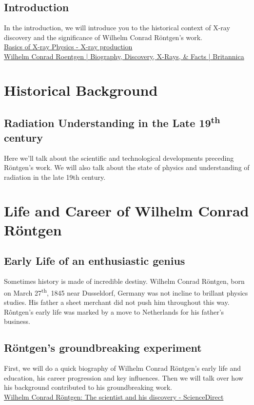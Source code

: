\documentclass[a4paper,12pt]{report}
\begin{document}
\newpage
\section*{Introduction}
In the introduction,  we will introduce you to the historical context of X-ray discovery and the significance of Wilhelm Conrad Röntgen's work. \\

\href{https://radiologymasterclass.co.uk}{Basics of X-ray Physics - X-ray production}\\ 

\href{https://www.britannica.com/biography/Wilhelm-Rontgen}{Wilhelm Conrad Roentgen | Biography, Discovery, X-Rays, \& Facts | Britannica }

\chapter{Historical Background}
\section{Radiation Understanding in the Late 19\textsuperscript{th} century}
  Here we’ll talk about the scientific and technological developments preceding Röntgen's work. We will also talk about the state of physics and understanding of radiation in the late 19th century. 

\chapter{Life and Career of Wilhelm Conrad Röntgen}
\section{Early Life of an enthusiastic genius}
Sometimes history is made of incredible destiny. Wilhelm Conrad Röntgen, born on March 27\textsuperscript{th}, 1845 near Dusseldorf, Germany was not incline to brillant physics studies. 
His father a sheet merchant did not push him throughout this way. Rôntgen's early life was marked by a move to Netherlands for his father's business.
\section{Röntgen's groundbreaking experiment}
First, we will do a quick biography of Wilhelm Conrad Röntgen's early life and education, his career progression and key influences. Then we will talk over how his background contributed to his groundbreaking work.~\\
\href{https://www.sciencedirect.com/science/article/pii/S1120179720302532}{Wilhelm Conrad Röntgen: The scientist and his discovery - ScienceDirect }
\end{document}
